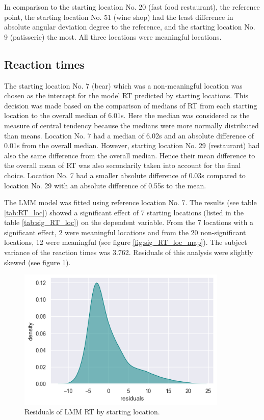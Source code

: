 In comparison to the starting location No. 20 (fast food restaurant), the reference point, the starting location No. 51 (wine shop) had the least difference in absolute angular deviation degree to the reference, and the starting location No. 9 (patisserie) the most. All three locations were meaningful locations.

\subsection{Reaction times}

The starting location No. 7 (bear) which was a non-meaningful location was chosen as the intercept for the model RT predicted by starting locations. This decision was made based on the comparison of medians of RT from each starting location to the overall median of 6.01s. Here the median was considered as the measure of central tendency because the medians were more normally distributed than means. Location No. 7 had a median of 6.02s and an absolute difference of 0.01s from the overall median. However, starting location No. 29 (restaurant) had also the same difference from the overall median. Hence their mean difference to the overall mean of RT was also secondarily taken into account for the final choice. Location No. 7 had a smaller absolute difference of 0.03s compared to location No. 29 with an absolute difference of 0.55s to the mean. 

The LMM model was fitted using reference location No. 7. The results (see table \ref{tab:RT_loc}) showed a significant effect of 7 starting locations (listed in the table \ref{tab:sig_RT_loc}) on the dependent variable. From the 7 locations with a significant effect, 2 were meaningful locations and from the 20 non-significant locations, 12 were meaningful (see figure \ref{fig:sig_RT_loc_map}). The subject variance of the reaction times was 3.762. Residuals of this analysis were slightly skewed (see figure \ref{fig:resid_RT_loc}).


\begin{figure}[!htb]
	\centering
	\includegraphics[width=100mm]{figures/residuals_RT_loc_23.png}
	\caption[Residuals of LMM RT by starting location]{Residuals of LMM RT by starting location.}
	\label{fig:resid_RT_loc}
\end{figure}


